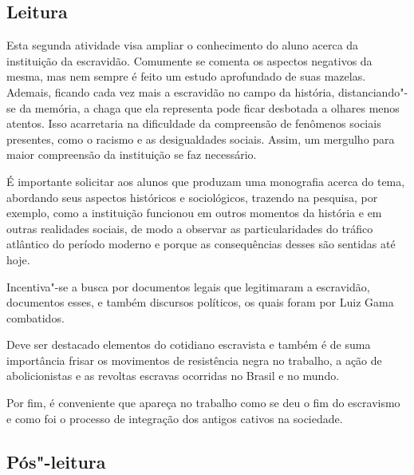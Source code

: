 \documentclass[12pt]{extarticle}
\begin{document}
\subsection{Leitura}


Esta segunda atividade visa ampliar o conhecimento do aluno
acerca da instituição da escravidão. Comumente se comenta os aspectos
negativos da mesma, mas nem sempre é feito um estudo aprofundado de suas
mazelas. Ademais, ficando cada vez mais a escravidão no campo da
história, distanciando"-se da memória, a chaga que ela representa pode
ficar desbotada a olhares menos atentos. Isso acarretaria na dificuldade
da compreensão de fenômenos sociais presentes, como o racismo e as
desigualdades sociais. Assim, um mergulho para maior compreensão da
instituição se faz necessário.

É importante solicitar aos alunos que produzam uma monografia acerca do
tema, abordando seus aspectos históricos e sociológicos, trazendo na
pesquisa, por exemplo, como a instituição funcionou em outros momentos
da história e em outras realidades sociais, de modo a observar as
particularidades do tráfico atlântico do período moderno e porque as
consequências desses são sentidas até hoje.

Incentiva"-se a busca por documentos legais que legitimaram a escravidão,
documentos esses, e também discursos políticos, os quais foram por Luiz
Gama combatidos.




Deve ser destacado elementos do cotidiano escravista e também é de suma
importância frisar os movimentos de resistência negra no trabalho, a
ação de abolicionistas e as revoltas escravas ocorridas no Brasil e no
mundo.

Por fim, é conveniente que apareça no trabalho como se deu o fim do
escravismo e como foi o processo de integração dos antigos cativos na
sociedade.

\subsection{Pós"-leitura}

\end{document}
